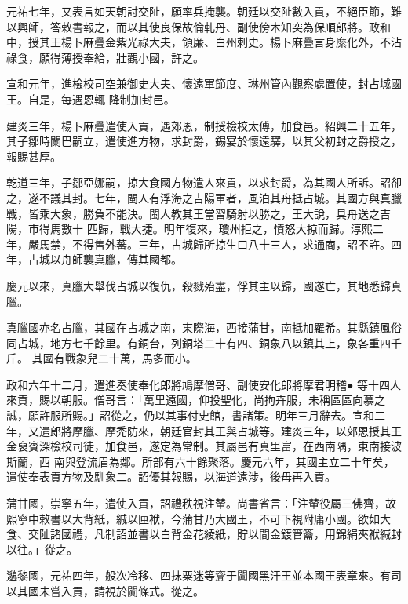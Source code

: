 \begin{pinyinscope}
 元祐七年，又表言如天朝討交阯，願率兵掩襲。朝廷以交阯數入貢，不絕臣節，難以興師，答敕書報之，而以其使良保故倫軋丹、副使傍木知突為保順郎將。政和中，授其王楊卜麻疊金紫光祿大夫，領廉、白州刺史。楊卜麻疊言身縻化外，不沾祿食，願得薄授奉給，壯觀小國，許之。



 宣和元年，進檢校司空兼御史大夫、懷遠軍節度、琳州管內觀察處置使，封占城國王。自是，每遇恩輒
 降制加封邑。



 建炎三年，楊卜麻疊遣使入貢，遇郊恩，制授檢校太傅，加食邑。紹興二十五年，其子鄒時闌巴嗣立，遣使進方物，求封爵，錫宴於懷遠驛，以其父初封之爵授之，報賜甚厚。



 乾道三年，子鄒亞娜嗣，掠大食國方物遣人來貢，以求封爵，為其國人所訴。詔卻之，遂不議其封。七年，閩人有浮海之吉陽軍者，風泊其舟抵占城。其國方與真臘戰，皆乘大象，勝負不能決。閩人教其王當習騎射以勝之，王大說，具舟送之吉陽，市得馬數十
 匹歸，戰大捷。明年復來，瓊州拒之，憤怒大掠而歸。淳熙二年，嚴馬禁，不得售外蕃。三年，占城歸所掠生口八十三人，求通商，詔不許。四年，占城以舟師襲真臘，傳其國都。



 慶元以來，真臘大舉伐占城以復仇，殺戮殆盡，俘其主以歸，國遂亡，其地悉歸真臘。



 真臘國亦名占臘，其國在占城之南，東際海，西接蒲甘，南抵加羅希。其縣鎮風俗同占城，地方七千餘里。有銅台，列銅塔二十有四、銅象八以鎮其上，象各重四千斤。
 其國有戰象兒二十萬，馬多而小。


政和六年十二月，遣進奏使奉化郎將鳩摩僧哥、副使安化郎將摩君明稽●
 等十四人來貢，賜以朝服。僧哥言：「萬里遠國，仰投聖化，尚拘卉服，未稱區區向慕之誠，願許服所賜。」詔從之，仍以其事付史館，書諸策。明年三月辭去。宣和二年，又遣郎將摩臘、摩禿防來，朝廷官封其王與占城等。建炎三年，以郊恩授其王金裒賓深檢校司徒，加食邑，遂定為常制。其屬邑有真里富，在西南隅，東南接波斯蘭，西
 南與登流眉為鄰。所部有六十餘聚落。慶元六年，其國主立二十年矣，遣使奉表貢方物及馴象二。詔優其報賜，以海道遠涉，後毋再入貢。



 蒲甘國，崇寧五年，遣使入貢，詔禮秩視注輦。尚書省言：「注輦役屬三佛齊，故熙寧中敕書以大背紙，緘以匣袱，今蒲甘乃大國王，不可下視附庸小國。欲如大食、交阯諸國禮，凡制詔並書以白背金花綾紙，貯以間金鍍管籥，用錦絹夾袱緘封以往。」從之。



 邈黎國，元祐四年，般次冷移、四抹粟迷等齎于闐國黑汗王並本國王表章來。有司以其國未嘗入貢，請視於闐條式。從之。




\end{pinyinscope}
